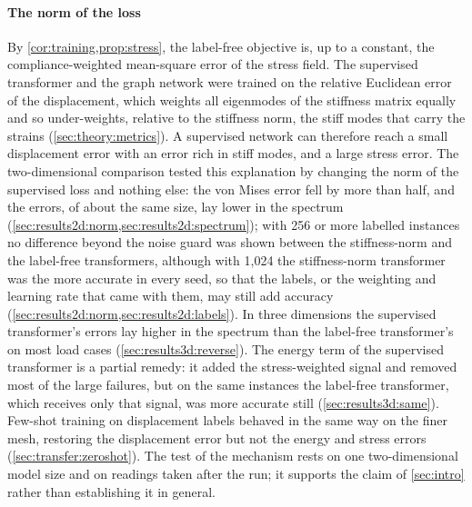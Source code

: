 \paragraph{The norm of the loss}
By \cref{cor:training,prop:stress}, the label-free objective is, up to a constant, the
compliance-weighted mean-square error of the stress field. The supervised transformer and
the graph network were trained on the relative Euclidean error of the displacement, which
weights all eigenmodes of the stiffness matrix equally and so under-weights, relative to the
stiffness norm, the stiff modes that carry the strains (\cref{sec:theory:metrics}). A
supervised network can therefore reach a small displacement error with an error rich in
stiff modes, and a large stress error. The two-dimensional comparison tested this
explanation by changing the norm of the supervised loss and nothing else: the von Mises
error fell by more than half, and the errors, of about the same size, lay lower in the
spectrum (\cref{sec:results2d:norm,sec:results2d:spectrum}); with 256 or more labelled
instances no difference beyond the noise guard was shown between the stiffness-norm and the
label-free transformers, although with 1,024 the stiffness-norm transformer was the more
accurate in every seed, so that the labels, or the weighting and learning rate that came
with them, may still add accuracy (\cref{sec:results2d:norm,sec:results2d:labels}). In three
dimensions the
supervised transformer's errors lay higher in the spectrum than the label-free
transformer's on most load cases (\cref{sec:results3d:reverse}). The energy term of the
supervised transformer is a partial remedy: it added the stress-weighted signal and removed
most of the large failures, but on the same instances the label-free transformer, which
receives only that signal, was more accurate still (\cref{sec:results3d:same}). Few-shot
training on displacement labels behaved in the same way on the finer mesh, restoring the
displacement error but not the energy and stress errors (\cref{sec:transfer:zeroshot}). The
test of the mechanism rests on one two-dimensional model size and on readings taken after
the run; it supports the claim of \cref{sec:intro} rather than establishing it in general.

